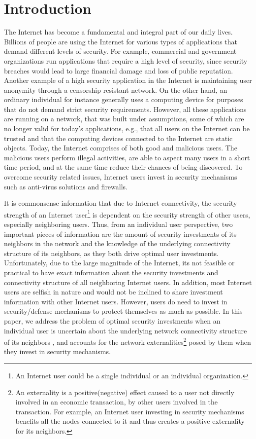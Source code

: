 \documentclass[letterpaper,12pt,onecolumn, nodraft]{IEEEtran}
\begin{document}
\section{Introduction}  \label{sec-intro}
The Internet has become a fundamental and integral part of our daily lives. Billions of people are using the Internet for various types of applications that demand different levels of security. For example, commercial and government organizations run applications that require a high level of security, since security breaches would lead to large financial damage and loss of public reputation. Another example of a high security application in the Internet is maintaining user anonymity through a censorship-resistant network. On the other hand, an ordinary individual for instance generally uses a computing device for purposes that do not demand strict security requirements. However, all these applications are running on a network, that was built under assumptions, some of which are no longer valid for today's applications, e.g., that all users on the Internet can be trusted and that the computing devices connected to the Internet are static objects. Today, the Internet comprises of both good and malicious users. The malicious users perform illegal activities, are able to aspect many users in a short time period, and at the same time reduce their chances of being discovered. To overcome security related issues, Internet users invest in security mechanisms such as anti-virus solutions and firewalls. 

It is commonsense information that due to Internet connectivity, the security strength of an Internet user\footnote{An Internet user could be a single individual or an individual organization.} is dependent on the security strength of other users, especially neighboring users. Thus, from an individual user perspective, two important pieces of information are the amount of security investments of its neighbors in the network and the knowledge of the underlying connectivity structure of its neighbors, as they both drive optimal user investments. Unfortunately, due to the large magnitude of the Internet, its not feasible or practical to have exact information about the security investments and connectivity structure of all neighboring Internet users. In addition, most Internet users are selfish in nature and would not be inclined to share investment information with other Internet users. However, users do need to invest in security/defense mechanisms to protect themselves as much as possible. In this paper, we address the problem of optimal security investments when an individual user is uncertain about the underlying network connectivity structure of its neighbors , and accounts for the network externalities\footnote{An externality is a positive(negative) effect caused to a user not directly involved in an economic transaction, by other users involved in the transaction. For example, an Internet user investing in security mechanisms benefits all the nodes connected to it and thus creates a positive externality for its neighbors.} posed by them when they invest in security mechanisms. 
\end{document}
